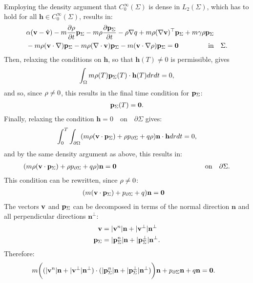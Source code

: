 Employing the density argument that $C_0^\infty(\Sigma)$ is dense in $L_2(\Sigma)$, which has to hold for all $\mathbf{h}\in C_0^\infty(\Sigma)$, results in:
\begin{align*}
&\alpha(\Stav - \hat \Stav)   - m \frac{\partial \Sta}{\partial t} \Adja  -  m\Sta \frac{\partial \Adja}{\partial t} 
-\Sta\nabla \Adjb +m \Sta (\nabla \Stav)^\top \Adja +m \gamma \Sta \Adja \\
&-m \Sta (\Stav \cdot \nabla)\Adja - m \Sta (\nabla \cdot \Stav)\Adja  - m (\Stav \cdot \nabla \Sta)\Adja=\mathbf{0} \ \qquad\qquad \text{in} \quad \Sigma.
\end{align*}
Then, relaxing the conditions on $\mathbf{h}$, so that $\mathbf{h}(T) \neq 0 $ is permissible, gives
\begin{align*}
 \int_\Omega m \rho(T) \mathbf{p}_\Sigma(T) \cdot \mathbf{h}(T) dr dt=0,
\end{align*}
and so, since $\rho \neq 0$, this results in the final time condition for $\mathbf{p}_\Sigma$:
\begin{align}
\mathbf{p}_\Sigma(T)=\mathbf{0}.
\end{align}
Finally, relaxing the condition $\mathbf{h}=0 \quad \text{on} \quad \partial \Sigma$ gives:
\begin{align*}
\int_0^T \int_{\partial\Omega} ( m \rho (\mathbf{v} \cdot \mathbf{p}_\Sigma)+\rho  p_{\partial \Sigma} + q \rho)  \mathbf{n}\cdot \mathbf{h} dr dt=0,
\end{align*}
and by the same density argument as above, this results in:
\begin{align*}
(m \rho (\mathbf{v} \cdot \mathbf{p}_\Sigma)+\rho  p_{\partial \Sigma} + q \rho) \mathbf{n} =\mathbf{0} \qquad \qquad\qquad\qquad\qquad\qquad \quad \text{on} \quad \partial \Sigma.
\end{align*}
This condition can be rewritten, since $\rho \neq 0$:
\begin{align*}
&(m (\mathbf{v} \cdot \mathbf{p}_\Sigma)+  p_{\partial \Sigma} + q) \mathbf{n} =\mathbf{0}
\end{align*}
The vectors $\mathbf{v}$ and $\mathbf{p}_\Sigma$ can be decomposed in terms of the normal direction $\mathbf{n}$ and all perpendicular directions $\mathbf{n}^\perp$:
\begin{align*}
\mathbf{v} &= |\mathbf{v}^n|\mathbf{n} + |\mathbf{v}^{\perp}| \mathbf{n}^\perp\\
\mathbf{p}_\Sigma &= |\mathbf{p}_\Sigma^n|\mathbf{n} + |\mathbf{p}_\Sigma^{\perp}| \mathbf{n}^\perp.
\end{align*}
Therefore:
\begin{align*}
&m \bigg((|\mathbf{v}^n|\mathbf{n} + |\mathbf{v}^\perp|\mathbf{n}^\perp) \cdot (|\mathbf{p}_\Sigma^n|\mathbf{n} + |\mathbf{p}_\Sigma^\perp|\mathbf{n}^\perp)\bigg)\mathbf{n}+  p_{\partial \Sigma}\mathbf{n} + q \mathbf{n} =\mathbf{0}.
\end{align*}
